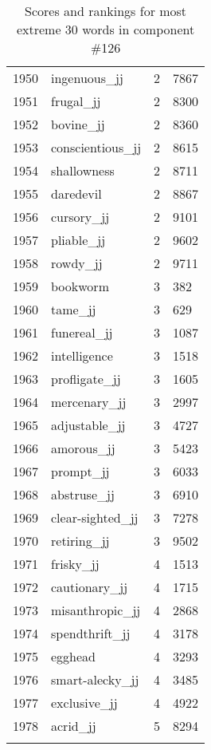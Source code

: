 \begin{longtable}[!htbp]{| rlr@{.}l |}
    1950 & ingenuous\_jj & 2 & 7867 \\
    1951 & frugal\_jj & 2 & 8300 \\
    1952 & bovine\_jj & 2 & 8360 \\
    1953 & conscientious\_jj & 2 & 8615 \\
    1954 & shallowness & 2 & 8711 \\
    1955 & daredevil & 2 & 8867 \\
    1956 & cursory\_jj & 2 & 9101 \\
    1957 & pliable\_jj & 2 & 9602 \\
    1958 & rowdy\_jj & 2 & 9711 \\
    1959 & bookworm & 3 & 382 \\
    1960 & tame\_jj & 3 & 629 \\
    1961 & funereal\_jj & 3 & 1087 \\
    1962 & intelligence & 3 & 1518 \\
    1963 & profligate\_jj & 3 & 1605 \\
    1964 & mercenary\_jj & 3 & 2997 \\
    1965 & adjustable\_jj & 3 & 4727 \\
    1966 & amorous\_jj & 3 & 5423 \\
    1967 & prompt\_jj & 3 & 6033 \\
    1968 & abstruse\_jj & 3 & 6910 \\
    1969 & clear-sighted\_jj & 3 & 7278 \\
    1970 & retiring\_jj & 3 & 9502 \\
    1971 & frisky\_jj & 4 & 1513 \\
    1972 & cautionary\_jj & 4 & 1715 \\
    1973 & misanthropic\_jj & 4 & 2868 \\
    1974 & spendthrift\_jj & 4 & 3178 \\
    1975 & egghead & 4 & 3293 \\
    1976 & smart-alecky\_jj & 4 & 3485 \\
    1977 & exclusive\_jj & 4 & 4922 \\
    1978 & acrid\_jj & 5 & 8294 \\
    \hline
    \caption{Scores and rankings for most extreme 30 words in component \#126} \\
\end{longtable}
